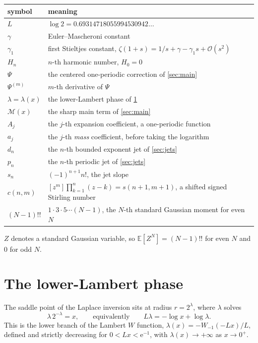 \documentclass[11pt,oneside]{article}
\theoremstyle{definition}
\theoremstyle{remark}
\newcommand{\e}{\mathrm e}
\newcommand{\E}{\mathbb E}
\newcommand{\bigO}{\mathcal O}
\begin{document}
\begin{center}
\begin{tabular}{@{}ll@{}}
\toprule
symbol & meaning\\
\midrule
$L$ & $\log2=0.69314718055994530942\dots$\\
$\gamma$ & Euler--Mascheroni constant\\
$\gamma_1$ & first Stieltjes constant, $\zeta(1+s)=1/s+\gamma-\gamma_1s+\bigO(s^2)$\\
$H_n$ & $n$-th harmonic number, $H_0=0$\\
$\Psi$ & the centered one-periodic correction of \cref{sec:main}\\
$\Psi^{(m)}$ & $m$-th derivative of $\Psi$\\
$\lambda=\lambda(x)$ & the lower-Lambert phase of \cref{sec:lambert}\\
$\mathcal M(x)$ & the sharp main term of \cref{sec:main}\\
$A_j$ & the $j$-th expansion coefficient, a one-periodic function\\
$a_j$ & the $j$-th \emph{mass} coefficient, before taking the logarithm\\
$d_n$ & the $n$-th bounded exponent jet of \cref{sec:jets}\\
$p_n$ & the $n$-th periodic jet of \cref{sec:jets}\\
$s_n$ & $(-1)^{n+1}n!$, the jet slope\\
$c(n,m)$ & $[z^m]\prod_{k=1}^n(z-k)=s(n+1,m+1)$, a shifted signed Stirling number\\
$(N-1)!!$ & $1\cdot3\cdot5\cdots(N-1)$, the $N$-th standard Gaussian moment for even $N$\\
\bottomrule
\end{tabular}
\end{center}

$Z$ denotes a standard Gaussian variable, so $\E[Z^N]=(N-1)!!$ for even $N$ and
$0$ for odd $N$.

\section{The lower-Lambert phase}\label{sec:lambert}

The saddle point of the Laplace inversion sits at radius $r=2^\lambda$, where
$\lambda$ solves
\begin{equation}\label{eq:lambda}
  \lambda\,2^{-\lambda}=x,
  \qquad\text{equivalently}\qquad
  L\lambda=-\log x+\log\lambda .
\end{equation}
This is the lower branch of the Lambert $W$ function,
$\lambda(x)=-W_{-1}(-Lx)/L$, defined and strictly decreasing for
$0<Lx<\e^{-1}$, with $\lambda(x)\to+\infty$ as $x\to0^+$.
\end{document}
